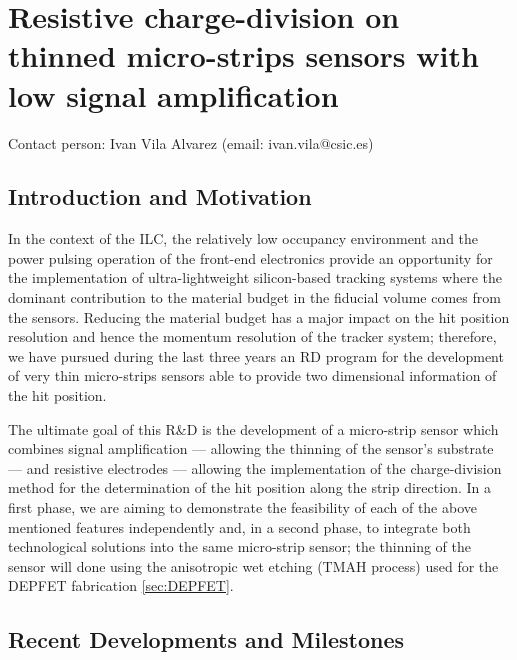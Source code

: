 \section{Resistive charge-division on thinned micro-strips sensors with low signal amplification}
Contact person: Ivan Vila Alvarez (email: ivan.vila@csic.es)
\subsection{Introduction and Motivation}

In the context of the ILC, the relatively low occupancy environment and the power pulsing operation of the front-end electronics provide an opportunity for the implementation of ultra-lightweight silicon-based tracking systems where the dominant contribution to the material budget in the fiducial volume comes from the sensors. Reducing the material budget has a major impact on the hit position resolution and hence the momentum resolution of the tracker system; therefore, we have pursued during the last three years an RD program for the development of very thin micro-strips sensors able to provide two dimensional information of the hit position.

The ultimate goal of this R\&D is the development of a micro-strip sensor which combines signal amplification --- allowing the thinning of the sensor’s substrate --- and resistive electrodes --- allowing the implementation of the charge-division method for the determination of the hit position along the strip direction. In a first phase, we are aiming to demonstrate the feasibility of each of the above mentioned features independently and, in a second phase, to integrate both technological solutions into the same micro-strip sensor; the thinning of the sensor will done using the anisotropic wet etching (TMAH process) used for the DEPFET fabrication \ref{sec:DEPFET}.

\subsection{Recent Developments and Milestones}


